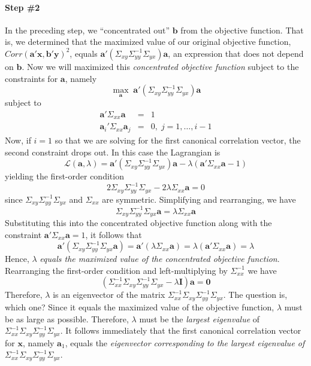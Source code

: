 \documentclass[12pt]{article}
\theoremstyle{definition}
\begin{document}
\paragraph{Step \#2} In the preceding step, we  ``concentrated out'' $\mathbf{b}$ from the objective function. That is, we determined that the maximized value of our original objective function, $Corr(\mathbf{a}'\mathbf{x}, \mathbf{b}'\mathbf{y})^2$, equals $\mathbf{a}'(\Sigma_{xy}\Sigma_{yy}^{-1}\Sigma_{yx})\mathbf{a}$, an expression that does not depend on $\mathbf{b}$. Now we will maximized this \emph{concentrated objective function} subject to the constraints for $\mathbf{a}$, namely
$$\max_\mathbf{a} \; \mathbf{a}'(\Sigma_{xy}\Sigma_{yy}^{-1}\Sigma_{yx})\mathbf{a}$$
subject to
\begin{eqnarray*}
   \textbf{a}'\Sigma_{xx}\textbf{a} &=& 1\\
    \mathbf{a}_i' \Sigma_{xx} \mathbf{a}_j &=& 0, \; j = 1, \hdots, i-1
\end{eqnarray*}
Now, if $i=1$ so that we are solving for the first canonical correlation vector, the second constraint drops out. In this case the Lagrangian is
  $$\mathcal{L}(\textbf{a}, \lambda) = \mathbf{a}'(\Sigma_{xy}\Sigma_{yy}^{-1}\Sigma_{yx})\mathbf{a} - \lambda \left(\mathbf{a}' \Sigma_{xx} \mathbf{a}   - 1\right) $$
yielding the first-order condition
  $$2\Sigma_{xy}\Sigma_{yy}^{-1} \Sigma_{yx} - 2\lambda \Sigma_{xx} \textbf{a} = 0$$
since $\Sigma_{xy}\Sigma_{yy}^{-1} \Sigma_{yx}$ and $\Sigma_{xx}$ are symmetric. Simplifying and rearranging, we have
  $$\Sigma_{xy}\Sigma_{yy}^{-1} \Sigma_{yx} \textbf{a} = \lambda\Sigma_{xx} \textbf{a}$$
Substituting this into the concentrated objective function along with the constraint $\mathbf{a}'\Sigma_{xx}\mathbf{a} = 1$, it follows that
  $$\mathbf{a}'(\Sigma_{xy}\Sigma_{yy}^{-1}\Sigma_{yx}\mathbf{a}) = \textbf{a}'(\lambda\Sigma_{xx} \textbf{a}) = \lambda(\textbf{a}'\Sigma_{xx}\textbf{a}) = \lambda$$
Hence, $\lambda$ \emph{equals the maximized value of the concentrated objective function}. Rearranging the first-order condition and left-multiplying by $\Sigma_{xx}^{-1}$ we have
  $$\left(\Sigma_{xx}^{-1}\Sigma_{xy}\Sigma_{yy}^{-1} \Sigma_{yx}  - \lambda \textbf{I}\right)\textbf{a} = \textbf{0}$$
Therefore, $\lambda$ is an eigenvector of the matrix $\Sigma_{xx}^{-1}\Sigma_{xy}\Sigma_{yy}^{-1} \Sigma_{yx}$. The question is, which one? Since it equals the maximized value of the objective function, $\lambda$ must be as large as possible. Therefore, $\lambda$ must be the \emph{largest eigenvalue} of $\Sigma_{xx}^{-1}\Sigma_{xy}\Sigma_{yy}^{-1} \Sigma_{yx}$. It follows immediately that the first canonical correlation vector for $\mathbf{x}$, namely $\mathbf{a}_1$, equals the \emph{eigenvector corresponding to the largest eigenvalue of} $\Sigma_{xx}^{-1}\Sigma_{xy}\Sigma_{yy}^{-1} \Sigma_{yx}$.
\end{document}
